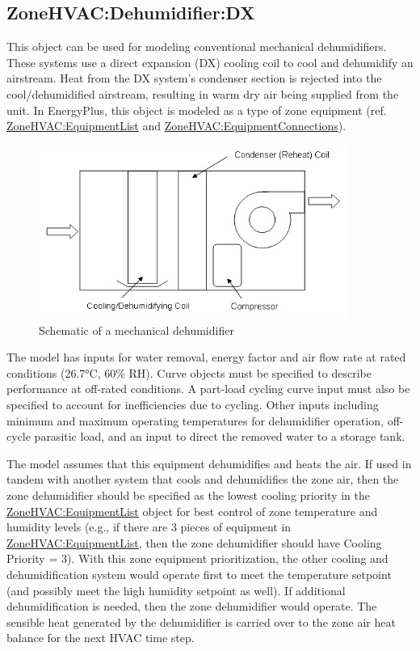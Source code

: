 \subsection{ZoneHVAC:Dehumidifier:DX}\label{zonehvacdehumidifierdx}

This object can be used for modeling conventional mechanical dehumidifiers. These systems use a direct expansion (DX) cooling coil to cool and dehumidify an airstream. Heat from the DX system's condenser section is rejected into the cool/dehumidified airstream, resulting in warm dry air being supplied from the unit. In EnergyPlus, this object is modeled as a type of zone equipment (ref. \hyperref[zonehvacequipmentlist]{ZoneHVAC:EquipmentList} and \hyperref[zonehvacequipmentconnections]{ZoneHVAC:EquipmentConnections}).

\begin{figure}[hbtp] %
\centering
\includegraphics[width=0.9\textwidth, height=0.9\textheight, keepaspectratio=true]{media/image292.png}
\caption{Schematic of a mechanical dehumidifier \protect \label{fig:schematic-of-a-mechanical-dehumidifier}}
\end{figure}

The model has inputs for water removal, energy factor and air flow rate at rated conditions (26.7°C, 60\% RH). Curve objects must be specified to describe performance at off-rated conditions. A part-load cycling curve input must also be specified to account for inefficiencies due to cycling. Other inputs including minimum and maximum operating temperatures for dehumidifier operation, off-cycle parasitic load, and an input to direct the removed water to a storage tank.

The model assumes that this equipment dehumidifies and heats the air. If used in tandem with another system that cools and dehumidifies the zone air, then the zone dehumidifier should be specified as the lowest cooling priority in the \hyperref[zonehvacequipmentlist]{ZoneHVAC:EquipmentList} object for best control of zone temperature and humidity levels (e.g., if there are 3 pieces of equipment in \hyperref[zonehvacequipmentlist]{ZoneHVAC:EquipmentList}, then the zone dehumidifier should have Cooling Priority = 3). With this zone equipment prioritization, the other cooling and dehumidification system would operate first to meet the temperature setpoint (and possibly meet the high humidity setpoint as well). If additional dehumidification is needed, then the zone dehumidifier would operate. The sensible heat generated by the dehumidifier is carried over to the zone air heat balance for the next HVAC time step.


